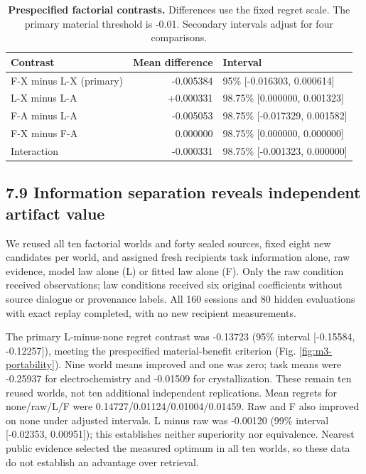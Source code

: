 \documentclass[10pt,twocolumn]{article}
\begin{document}
\begin{table}[t]
\centering
\caption{\textbf{Prespecified factorial contrasts.} Differences use the fixed regret scale.
The primary material threshold is -0.01. Secondary intervals adjust for four comparisons.}
\begin{tabular}{@{}lrl@{}}
\toprule
Contrast & Mean difference & Interval \\
\midrule
F-X minus L-X (primary) & -0.005384 & 95\% [-0.016303, 0.000614] \\
L-X minus L-A & +0.000331 & 98.75\% [0.000000, 0.001323] \\
F-A minus L-A & -0.005053 & 98.75\% [-0.017329, 0.001582] \\
F-X minus F-A & 0.000000 & 98.75\% [0.000000, 0.000000] \\
Interaction & -0.000331 & 98.75\% [-0.001323, 0.000000] \\
\bottomrule
\end{tabular}
\end{table}

\subsection{7.9 Information separation reveals independent artifact
value}\label{information-separation-reveals-independent-artifact-value}

We reused all ten factorial worlds and forty sealed sources, fixed eight
new candidates per world, and assigned fresh recipients task information
alone, raw evidence, model law alone (L) or fitted law alone (F). Only
the raw condition received observations; law conditions received six
original coefficients without source dialogue or provenance labels. All
160 sessions and 80 hidden evaluations with exact replay completed, with
no new recipient measurements.

The primary L-minus-none regret contrast was -0.13723 (95\% interval
{[}-0.15584, -0.12257{]}), meeting the prespecified material-benefit
criterion (Fig. \ref{fig:m3-portability}). Nine world means improved and
one was zero; task means were -0.25937 for electrochemistry and -0.01509
for crystallization. These remain ten reused worlds, not ten additional
independent replications. Mean regrets for none/raw/L/F were
0.14727/0.01124/0.01004/0.01459. Raw and F also improved on none under
adjusted intervals. L minus raw was -0.00120 (99\% interval {[}-0.02353,
0.00951{]}); this establishes neither superiority nor equivalence.
Nearest public evidence selected the measured optimum in all ten worlds,
so these data do not establish an advantage over retrieval.
\end{document}
